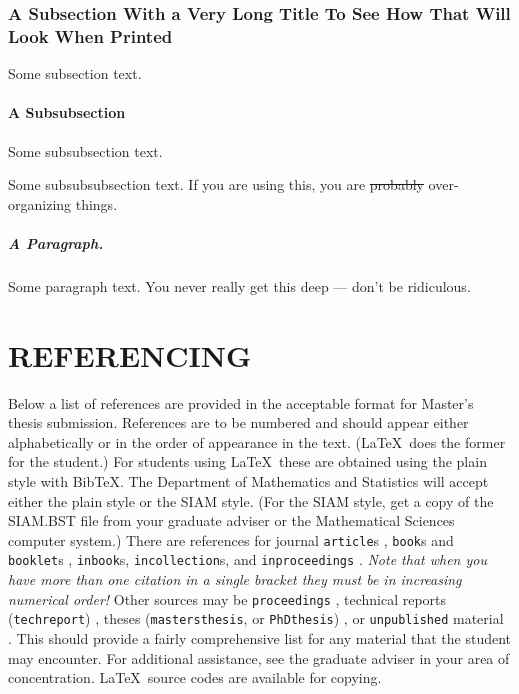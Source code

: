 \subsection{A Subsection With a Very Long Title To See How That Will
  Look When Printed}

Some subsection text.

\subsubsection{A Subsubsection}

Some subsubsection text.


Some subsubsubsection text.  If you are using this, you are
\sout{probably} over-organizing things.

\paragraph{A Paragraph.}

Some paragraph text.  You never really get this deep --- don't be
ridiculous.




\chapter{REFERENCING}

Below a list of references are provided in the acceptable format for
Master's thesis submission. References are to be numbered and should
appear either alphabetically or in the order of appearance in the
text.  (\LaTeX\ does the former for the student.) For students using
\LaTeX\ these are obtained using the plain style with {\sc
Bib}\TeX. The Department of Mathematics and Statistics will accept
either the plain style or the SIAM style. (For the SIAM style, get a
copy of the SIAM.BST file from your graduate adviser or the
Mathematical Sciences computer system.) There are references for
journal \verb+article+s \cite{ART}, \verb+book+s and \verb+booklet+s
\cite{BOK,BKL}, \verb+inbook+s, \verb+incollection+s, and
\verb+inproceedings+
\cite{INC,INB,INP}. \emph{Note that when you have more than one citation in a single bracket
they must be in increasing numerical order!}  Other sources may be
\verb+proceedings+ \cite{PRO}, technical reports (\verb+techreport+)
\cite{TEC}, theses (\verb+mastersthesis+, or \verb+PhDthesis+)
\cite{MTH}, or \verb+unpublished+ material \cite{UNP}.  This should
provide a fairly comprehensive list for any material that the student
may encounter.  For additional assistance, see the graduate adviser in
your area of concentration. \LaTeX\ source codes are available for
copying.

